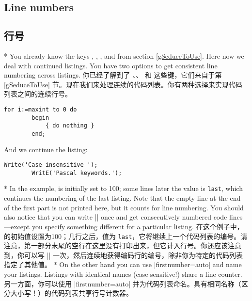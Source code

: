 \begin{paracol}{2}
\subsection{Line numbers}\label{uLineNumbers}
\switchcolumn
\subsection{行号}
\switchcolumn[0]*%
You already know the keys , ,
, and  from section
\ref{gSeduceToUse}. Here now we deal with continued listings.
You have two options to get consistent line numbering across listings.
\switchcolumn
你已经了解到了 、、 和  这些键，它们来自于第 \ref{gSeduceToUse} 节。现在我们来处理连续的代码列表。你有两种选择来实现代码列表之间的连续行号。

\begin{lstsample}[firstnumber]{\lstset{numbers=left,numberstyle=\tiny,^^A
        stepnumber=2,numbersep=5pt}}{}
        \begin{lstlisting}[firstnumber=100]
        for i:=maxint to 0 do
        begin
            { do nothing }
        end;

        \end{lstlisting}
        And we continue the listing:
        \begin{lstlisting}[firstnumber=last]
        Write('Case insensitive ');
        WritE('Pascal keywords.');
        \end{lstlisting}
\end{lstsample}
\switchcolumn[0]*%
In the example,  is initially set to 100; some lines
later the value is \texttt{last}, which continues the numbering of the last
listing. Note that the empty line at the end of the first part is not printed
here, but it counts for line numbering. You should also notice that you can
write |\lstset{firstnumber=last}| once and get consecutively numbered code
lines---except you specify something different for a particular listing.
\switchcolumn
在这个例子中， 的初始值设置为100；几行之后，值为 \texttt{last}，它将继续上一个代码列表的编号。请注意，第一部分末尾的空行在这里没有打印出来，但它计入行号。你还应该注意到，你可以写 |\lstset{firstnumber=last}| 一次，然后连续地获得编码行的编号，除非你为特定的代码列表指定了其他值。
\switchcolumn[0]*%
On the other hand you can use |firstnumber=auto| and name your listings.
Listings with identical names (case sensitive!) share a line counter.
\switchcolumn
另一方面，你可以使用 |firstnumber=auto| 并为代码列表命名。具有相同名称（区分大小写！）的代码列表共享行号计数器。


\end{paracol}
